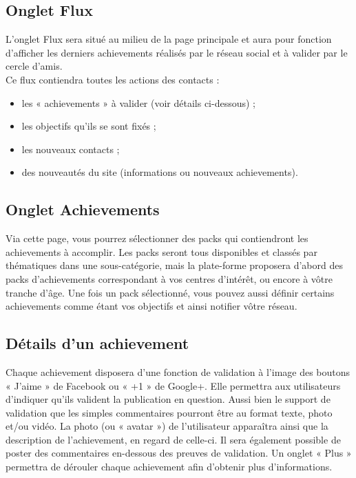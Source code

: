 \documentclass{life-fr}
\begin{document}
\subsection{Onglet Flux}

L'onglet Flux sera situé au milieu de la page principale et aura pour fonction d'afficher les derniers achievements réalisés par le réseau social et à valider par le cercle d'amis.\\

Ce flux contiendra toutes les actions des contacts :

\begin{itemize}
	\item les « achievements » à valider (voir détails ci-dessous) ;
	\item les objectifs qu'ils se sont fixés ;
	\item les nouveaux contacts ;
	\item des nouveautés du site (informations ou nouveaux achievements).
\end{itemize}

\newpage

\subsection{Onglet Achievements}

Via cette page, vous pourrez sélectionner des packs qui contiendront les achievements à accomplir. Les packs seront tous disponibles et classés par thématiques dans une sous-catégorie, mais la plate-forme proposera d'abord des packs d'achievements correspondant à vos centres d'intérêt, ou encore à vôtre tranche d'âge. Une fois un pack sélectionné, vous pouvez aussi définir certains achievements comme étant vos objectifs et ainsi notifier vôtre réseau.

\subsection{Détails d'un achievement}

Chaque achievement disposera d'une fonction de validation à l'image des boutons « J'aime » de Facebook ou « +1 » de Google+. Elle permettra aux utilisateurs d'indiquer qu'ils valident la publication en question. Aussi bien le support de validation que les simples commentaires pourront être au format texte, photo et/ou vidéo. La photo (ou « avatar ») de l'utilisateur apparaîtra ainsi que la description de l'achievement, en regard de celle-ci. Il sera également possible de poster des commentaires en-dessous des preuves de validation. Un onglet « Plus » permettra de dérouler chaque achievement afin d'obtenir plus d'informations.\\
\end{document}

